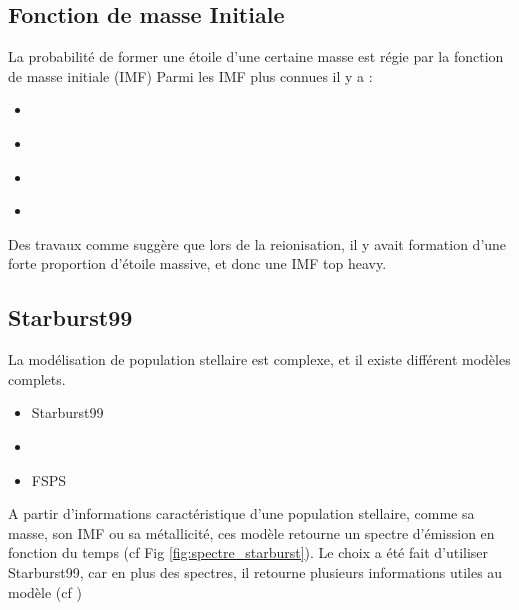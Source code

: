 
\subsection{Fonction de masse Initiale}

La probabilité de former une étoile d'une certaine masse est régie par la fonction de masse initiale (\ac{IMF})
Parmi les \ac{IMF} plus connues il y a :

\begin{itemize}
\item \cite{1955ApJ...121..161S}
\item \cite{1979ApJS...41..513M}
\item \cite{2001MNRAS.322..231K}
\item \cite{2003PASP..115..763C}
\end{itemize}


Des travaux comme \cite{2003MNRAS.344L...7C} suggère que lors de la reionisation, il y avait formation d'une forte proportion d'étoile massive, et donc une \ac{IMF} top heavy.


\subsection{Starburst99}
\label{sec:staburst}

La modélisation de population stellaire est complexe, et il existe différent modèles complets.
\begin{itemize}
\item Starburst99 \citep{leitherer_starburst99:_1999} 
\item \cite{2003MNRAS.344.1000B}
\item FSPS \cite{2009ApJ...699..486C}
\end{itemize}

A partir d'informations caractéristique d'une population stellaire, comme sa masse, son \ac{IMF} ou sa métallicité, ces modèle retourne un spectre d'émission en fonction du temps (cf Fig \ref{fig:spectre_starburst}).
Le choix a été fait d'utiliser Starburst99, car en plus des spectres, il retourne plusieurs informations utiles au modèle (cf ) %


